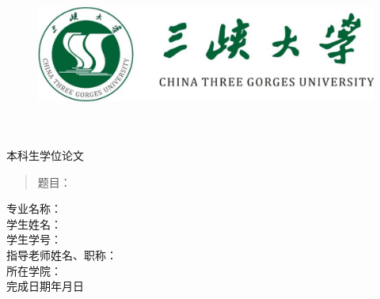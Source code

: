 % 

\thispagestyle{empty}
\begin{figure}[t]
    \centering
    \includegraphics{pics/icon.jpg}
\end{figure}
\begin{center}
    \quad \\
    \quad \\
    \heiti \fontsize{40pt}{48pt} 本科生学位论文
    \vspace{30mm}
\end{center}
\begin{quotation}
    {\heiti{}
        题目：
    }
\end{quotation}
\vspace{30mm}
\begin{center}
    \heiti\fontsize{15}{18}
    专\hspace*{2.4em}业\hspace*{2.4em}名\hspace*{2.4em}称：\underline{\hspace{56mm}}\vspace{4mm}\\
    学\hspace*{2.4em}生\hspace*{2.4em}姓\hspace*{2.4em}名：\underline{\hspace{56mm}}\vspace{4mm}\\
    学\hspace*{2.4em}生\hspace*{2.4em}学\hspace*{2.4em}号：\underline{\hspace{56mm}}\vspace{4mm}\\
    指导老师姓名、职称：\underline{\hspace{56mm}}\vspace{4mm}\\
    所\hspace*{2.4em}在\hspace*{2.4em}学\hspace*{2.4em}院：\underline{\hspace{56mm}}\vspace{4mm}\\
    \vspace{15mm}
    {\centering 完成日期\hspace*{6em}年\hspace*{3em}月\hspace*{3em}日}
\end{center}
\clearpage

% 
